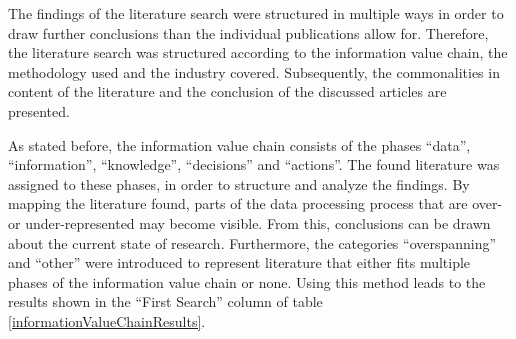 






The findings of the literature search were structured in multiple ways in order to draw further conclusions than the individual publications allow for. Therefore, the literature search was structured according to the information value chain, the methodology used and the industry covered. Subsequently, the commonalities in content of the literature and the conclusion of the discussed articles are presented.


As stated before, the information value chain consists of the phases \enquote{data}, \enquote{information}, \enquote{knowledge}, \enquote{decisions} and \enquote{actions}. The found literature was assigned to these phases, in order to structure and analyze the findings. %
By mapping the literature found, parts of the data processing process that are over- or under-represented may become visible. From this, conclusions can be drawn about the current state of research. Furthermore, the categories \enquote{overspanning} and \enquote{other} were introduced to represent literature that either fits multiple phases of the information value chain or none. Using this method leads to the results shown in the \enquote{First Search} column of table \ref{informationValueChainResults}.

